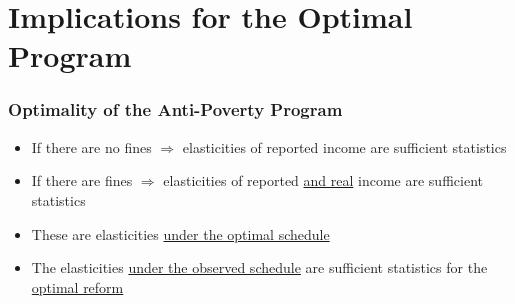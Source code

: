 \documentclass[xcolor=pdftex,dvipsnames,table]{beamer}
\begin{document}
\section{Implications for the Optimal Program}

\begin{frame}[label=implications]
\frametitle{Optimality of the Anti-Poverty Program}
\begin{itemize}
\item If there are no fines $\Rightarrow$ elasticities of reported income are sufficient statistics
\item If there are fines $\Rightarrow$ elasticities of reported \underline{and real} income are sufficient statistics
\item These are elasticities \underline{under the optimal schedule}
\item The elasticities \underline{under the observed schedule} are sufficient statistics for the \underline{optimal reform}
\end{itemize}
\hyperlink{theory}{}
\hyperlink{imp}{}
\hyperlink{prop_imp}{}
\hyperlink{reform}{}
\end{frame}
\end{document}
